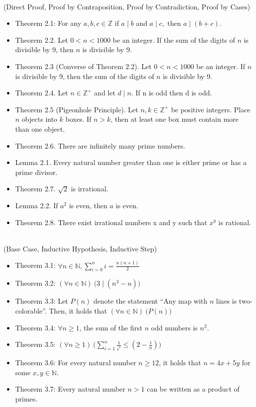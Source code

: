 \documentclass{article}
\begin{document}
\\
(Direct Proof, Proof by Contraposition, Proof by Contradiction, Proof by Cases)
\begin{itemize}
\item Theorem 2.1: For any $a, b, c\in\mathbb{Z}$ if $a\mid b$ and $a\mid c,$ then $a\mid(b + c)$.
\item Theorem 2.2. Let $0 < n < 1000$ be an integer. If the sum of the digits of $n$ is divisible by 9, then $n$ is divisible by 9.
\item Theorem 2.3 (Converse of Theorem 2.2). Let $0 < n < 1000$ be an integer. If $n$ is divisible by 9, then the sum of the digits of $n$ is divisible by 9.
\item Theorem 2.4. Let $n\in\mathbb{Z^+}$ and let $d\mid n$. If n is odd then d is odd.
\item Theorem 2.5 (Pigeonhole Principle). Let $n, k\in\mathbb{Z^+}$ be positive integers. Place $n$ objects into $k$ boxes. If $n > k$, then at least one box must contain more than one object.
\item Theorem 2.6. There are infinitely many prime numbers.
\item Lemma 2.1. Every natural number greater than one is either prime or has a prime divisor.
\item Theorem 2.7. $\sqrt{2}$ is irrational.
\item Lemma 2.2. If $a^2$ is even, then $a$ is even.
\item Theorem 2.8. There exist irrational numbers x and y such that $x^y$ is rational. \\
\end{itemize}

\\
(Base Case, Inductive Hypothesis, Inductive Step)
\begin{itemize}
\item Theorem 3.1: $\forall n\in\mathbb{N}, \sum\limits_{i=0}^{n} i = \frac{n(n+1)}{2}$
\item Theorem 3.2: $(\forall n\in\mathbb{N})\ \big(3\mid(n^3-n)\big)$
\item Theorem 3.3: Let $P(n)$ denote the statement ``Any map with $n$ lines is two-colorable''. Then, it holds that $(\forall n\in\mathbb{N})\ \big(P(n)\big)$
\item Theorem 3.4: $\forall n\geq1$, the sum of the first $n$ odd numbers is $n^2.$
\item Theorem 3.5: $(\forall n\geq1)\ \big(\sum\limits_{i=1}^{n} \frac{1}{i^2}\leq(2 - \frac{1}{n})\big)$
\item Theorem 3.6: For every natural number $n\geq12$, it holds that $n = 4x + 5y$ for some $x, y\in\mathbb{N}$.
\item Theorem 3.7: Every natural number $n>1$ can be written as a product of primes.
\end{itemize}
\end{document}
